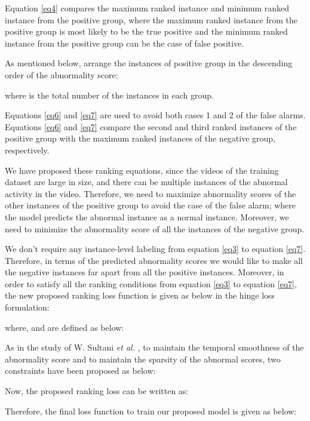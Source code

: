 \documentclass[conference]{IEEEtran}
\begin{document}
Equation \ref{eq4} compares the maximum ranked instance and minimum ranked instance from the positive group, where the maximum ranked instance from the positive group is most likely to be the true positive and the minimum ranked instance from the positive group can be the case of false positive.

As mentioned below, arrange the instances of positive group in the descending order of the abnormality score:

where  is the total number of the instances in each group.



Equations \ref{eq6} and \ref{eq7} are used to avoid both cases 1 and 2 of the false alarms. Equations \ref{eq6} and \ref{eq7} compare the second and third ranked instances of the positive group with the maximum ranked instances of the negative group, respectively. 

We have proposed these ranking equations, since the videos of the training dataset are large in size, and there can be multiple instances of the abnormal activity in the video. Therefore, we need to maximize abnormality scores of the other instances of the positive group to avoid the case  of the false alarm; where the model predicts the abnormal instance as a normal instance. Moreover, we need to minimize the abnormality score of all the instances of the negative group.

We don't require any instance-level labeling from equation \ref{eq3} to equation \ref{eq7}. Therefore, in terms of the predicted abnormality scores we would like to make all the negative instances far apart from all the positive instances. Moreover, in order to satisfy all the ranking conditions from equation \ref{eq3} to equation \ref{eq7}, the new proposed ranking loss function is given as below in the hinge loss formulation:


where,  and  are defined as below:





As in the study of W. Sultani \textit{et al.} \cite{A6}, to maintain the temporal smoothness of the abnormality score and to maintain the sparsity of the abnormal scores, two constraints have been proposed as below:



Now, the proposed ranking loss can be written as: 


Therefore, the final loss function to train our proposed model is given as below:
 
\end{document}
